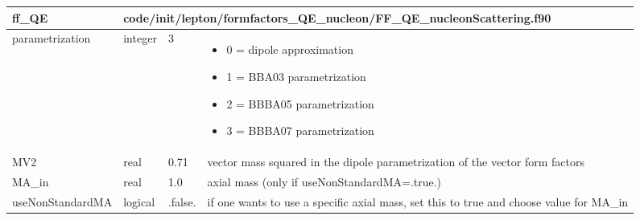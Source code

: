 \documentclass{article}
\begin{document}
\begin{longtable}{llll}
\toprule
\textbf{\large{ff\_QE}} & \multicolumn{3}{l}{\footnotesize{code/init/lepton/formfactors\_QE\_nucleon/FF\_QE\_nucleonScattering.f90}}\\*
\midrule
\endfirsthead
\midrule
\endhead
parametrization & \begin{minipage}[t]{2cm}integer\end{minipage} & \begin{minipage}[t]{2cm}3\end{minipage} & \begin{minipage}[t]{12cm}\begin{itemize}\leftmargin0em\itemindent0pt\item 0 = dipole approximation\item 1 = BBA03 parametrization\item 2 = BBBA05 parametrization\item 3 = BBBA07 parametrization\end{itemize}\end{minipage}\\*
\midrule
MV2 & \begin{minipage}[t]{2cm}real\end{minipage} & \begin{minipage}[t]{2cm}0.71\end{minipage} & \begin{minipage}[t]{12cm}vector mass squared in the dipole parametrization of the vector form factors\end{minipage}\\*
\midrule
MA\_in & \begin{minipage}[t]{2cm}real\end{minipage} & \begin{minipage}[t]{2cm}1.0\end{minipage} & \begin{minipage}[t]{12cm}axial mass (only if useNonStandardMA=.true.)\end{minipage}\\*
\midrule
useNonStandardMA & \begin{minipage}[t]{2cm}logical\end{minipage} & \begin{minipage}[t]{2cm}.false.\end{minipage} & \begin{minipage}[t]{12cm}if one wants to use a specific axial mass, set this to true and choose value for MA\_in\end{minipage}\\*

\end{longtable}
\end{document}
